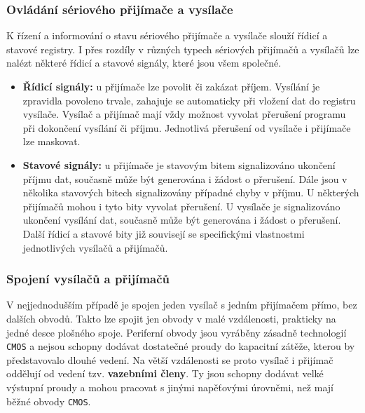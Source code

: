       \subsubsection{Ovládání sériového přijímače a vysílače}
        K řízení a informování o stavu sériového přijímače a vysílače slouží řídicí a stavové 
        registry. I přes rozdíly v různých typech sériových přijímačů a vysílačů lze nalézt některé 
        řídicí a stavové signály, které jsou všem společné.
        \begin{itemize}[noitemsep]
          \item \textbf{Řídicí signály:} u přijímače lze povolit či zakázat příjem. Vysílání 
                je zpravidla povoleno trvale, zahajuje se automaticky při vložení dat do registru 
                vysílače. Vysílač a přijímač mají vždy možnost vyvolat přerušení programu při 
                dokončení vysílání či příjmu.  Jednotlivá přerušení od vysílače i přijímače lze 
                maskovat.
          \item \textbf{Stavové signály:} u přijímače je stavovým bitem signalizováno ukončení
                příjmu dat, současně může být generována i žádost o přerušení. Dále jsou v několika
                stavových bitech signalizovány případné chyby v příjmu. U některých přijímačů mohou
                i tyto bity vyvolat přerušení. U vysílače je signalizováno ukončení vysílání dat,
                současně může být generována i žádost o přerušení. Další řídicí a stavové bity již
                souvisejí se specifickými vlastnostmi jednotlivých vysílačů a přijímačů.
        \end{itemize}
        
      \subsubsection{Spojení vysílačů a přijímačů}\label{MIT:chap_TxRx_con}
        V nejjednodušším případě je spojen jeden vysílač s jedním přijímačem přímo, bez dalších
        obvodů. Takto lze spojit jen obvody v malé vzdálenosti, prakticky na jedné desce plošného
        spoje. Periferní obvody jsou vyráběny zásadně technologií \texttt{CMOS} a nejsou schopny
        dodávat dostatečné proudy do kapacitní zátěže, kterou by představovalo dlouhé vedení. Na
        větší vzdálenosti se proto vysílač i přijímač oddělují od vedení tzv. \textbf{vazebními
        členy}. Ty jsou schopny dodávat velké výstupní proudy a mohou pracovat s jinými napěťovými
        úrovněmi, než mají běžné obvody \texttt{CMOS}.
        

